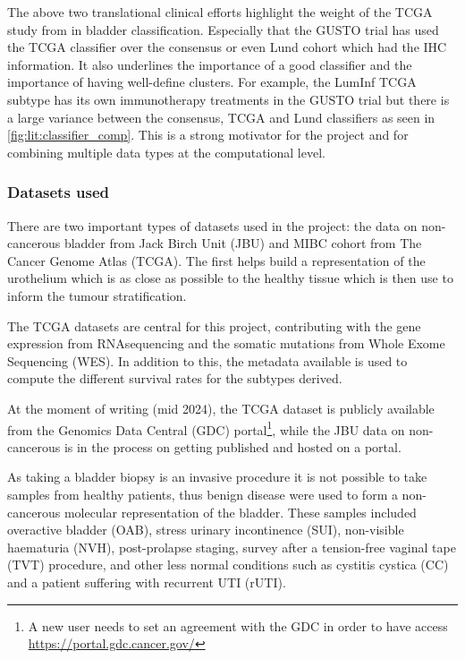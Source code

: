 The above two translational clinical efforts highlight the weight of the TCGA study from \citet{Robertson2017-mg} in bladder classification. Especially that the GUSTO trial has used the TCGA classifier over the consensus or even Lund cohort which had the IHC information. It also underlines the importance of a good classifier and the importance of having well-define clusters. For example, the LumInf TCGA subtype has its own immunotherapy treatments in the GUSTO trial \citet{Griffin2024-zr} but there is a large variance between the consensus, TCGA and Lund classifiers as seen in \cref{fig:lit:classifier_comp}. This is a strong motivator for the project and for combining multiple data types at the computational level.


\subsubsection{Datasets used}

There are two important types of datasets used in the project: the data on non-cancerous bladder from Jack Birch Unit (JBU) and MIBC cohort from The Cancer Genome Atlas (TCGA). The first helps build a representation of the urothelium which is as close as possible to the healthy tissue which is then use to inform the tumour stratification.

The TCGA datasets are central for this project, contributing with the gene expression from RNAsequencing and the somatic mutations from Whole Exome Sequencing (WES). In addition to this, the metadata available is used to compute the different survival rates for the subtypes derived. 

At the moment of writing (mid 2024), the TCGA dataset is publicly available from the Genomics Data Central (GDC) portal\footnote{A new user needs to set an agreement with the GDC in order to have access \url{https://portal.gdc.cancer.gov/}}, while the JBU data on non-cancerous is in the process on getting published and hosted on a portal.

As taking a bladder biopsy is an invasive procedure it is not possible to take samples from healthy patients, thus benign disease were used to form a non-cancerous molecular representation of the bladder. These samples included overactive bladder (OAB), stress urinary incontinence (SUI), non-visible haematuria (NVH), post-prolapse staging, survey after a tension-free vaginal tape (TVT) procedure, and other less normal conditions such as cystitis cystica (CC) and a patient suffering with recurrent UTI (rUTI).

